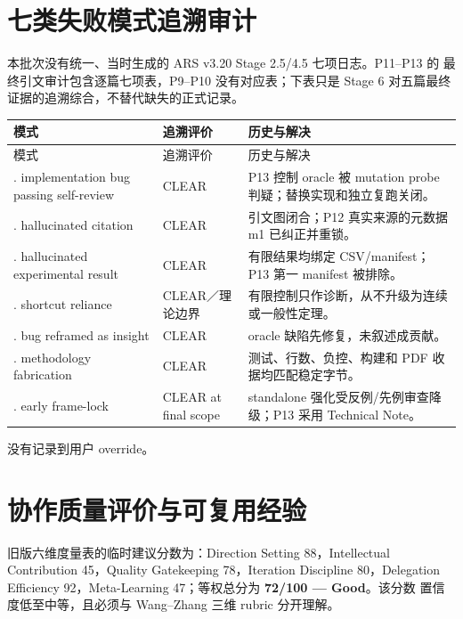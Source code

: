 \documentclass[11pt,a4paper]{article}
\begin{document}
\section{七类失败模式追溯审计}

本批次没有统一、当时生成的 ARS v3.20 Stage 2.5/4.5 七项日志。P11--P13 的
最终引文审计包含逐篇七项表，P9--P10 没有对应表；下表只是 Stage 6 对五篇最终
证据的追溯综合，不替代缺失的正式记录。

\small
\begin{longtable}{@{}>{\raggedright\arraybackslash}p{}>{\raggedright\arraybackslash}p{}>{\raggedright\arraybackslash}p{}@{}}
\toprule
模式 & 追溯评价 & 历史与解决\\
\midrule
\endfirsthead
\toprule
模式 & 追溯评价 & 历史与解决\\
\midrule
\endhead
1. implementation bug passing self-review & CLEAR & P13 控制 oracle 被 mutation probe 判疑；替换实现和独立复跑关闭。\\
2. hallucinated citation & CLEAR & 引文图闭合；P12 真实来源的元数据 m1 已纠正并重锁。\\
3. hallucinated experimental result & CLEAR & 有限结果均绑定 CSV/manifest；P13 第一 manifest 被排除。\\
4. shortcut reliance & CLEAR／理论边界 & 有限控制只作诊断，从不升级为连续或一般性定理。\\
5. bug reframed as insight & CLEAR & oracle 缺陷先修复，未叙述成贡献。\\
6. methodology fabrication & CLEAR & 测试、行数、负控、构建和 PDF 收据均匹配稳定字节。\\
7. early frame-lock & CLEAR at final scope & standalone 强化受反例/先例审查降级；P13 采用 Technical Note。\\
\bottomrule
\end{longtable}
\normalsize

没有记录到用户 override。

\section{协作质量评价与可复用经验}

旧版六维度量表的临时建议分数为：Direction Setting 88，Intellectual
Contribution 45，Quality Gatekeeping 78，Iteration Discipline 80，Delegation
Efficiency 92，Meta-Learning 47；等权总分为 \textbf{72/100 — Good}。该分数
置信度低至中等，且必须与 Wang--Zhang 三维 rubric 分开理解。
\end{document}
